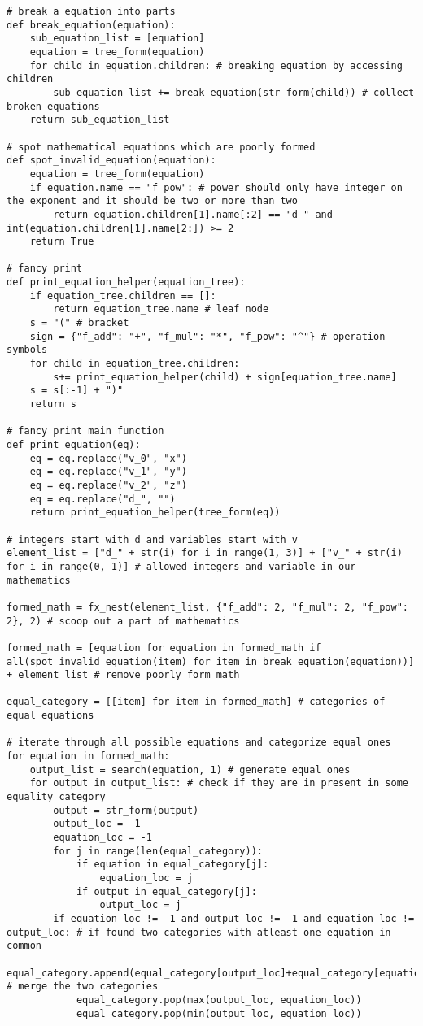 \documentclass{book}
\begin{document}
\begin{lstlisting}[style=mystyle, caption={main.py}, label={lst:python_code}]
# break a equation into parts
def break_equation(equation):
    sub_equation_list = [equation]
    equation = tree_form(equation)
    for child in equation.children: # breaking equation by accessing children
        sub_equation_list += break_equation(str_form(child)) # collect broken equations
    return sub_equation_list

# spot mathematical equations which are poorly formed
def spot_invalid_equation(equation):
    equation = tree_form(equation)
    if equation.name == "f_pow": # power should only have integer on the exponent and it should be two or more than two
        return equation.children[1].name[:2] == "d_" and int(equation.children[1].name[2:]) >= 2
    return True

# fancy print
def print_equation_helper(equation_tree):
    if equation_tree.children == []:
        return equation_tree.name # leaf node
    s = "(" # bracket
    sign = {"f_add": "+", "f_mul": "*", "f_pow": "^"} # operation symbols
    for child in equation_tree.children:
        s+= print_equation_helper(child) + sign[equation_tree.name]
    s = s[:-1] + ")"
    return s

# fancy print main function
def print_equation(eq):
    eq = eq.replace("v_0", "x")
    eq = eq.replace("v_1", "y")
    eq = eq.replace("v_2", "z")
    eq = eq.replace("d_", "")
    return print_equation_helper(tree_form(eq))

# integers start with d and variables start with v
element_list = ["d_" + str(i) for i in range(1, 3)] + ["v_" + str(i) for i in range(0, 1)] # allowed integers and variable in our mathematics

formed_math = fx_nest(element_list, {"f_add": 2, "f_mul": 2, "f_pow": 2}, 2) # scoop out a part of mathematics

formed_math = [equation for equation in formed_math if all(spot_invalid_equation(item) for item in break_equation(equation))] + element_list # remove poorly form math

equal_category = [[item] for item in formed_math] # categories of equal equations

# iterate through all possible equations and categorize equal ones
for equation in formed_math:
    output_list = search(equation, 1) # generate equal ones
    for output in output_list: # check if they are in present in some equality category
        output = str_form(output)
        output_loc = -1
        equation_loc = -1
        for j in range(len(equal_category)):
            if equation in equal_category[j]:
                equation_loc = j
            if output in equal_category[j]:
                output_loc = j
        if equation_loc != -1 and output_loc != -1 and equation_loc != output_loc: # if found two categories with atleast one equation in common
            equal_category.append(equal_category[output_loc]+equal_category[equation_loc]) # merge the two categories
            equal_category.pop(max(output_loc, equation_loc))
            equal_category.pop(min(output_loc, equation_loc))


\end{lstlisting}
\end{document}
